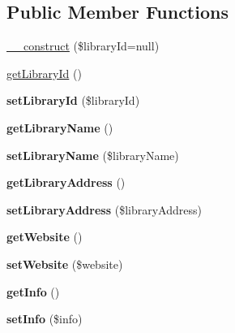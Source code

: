 \subsection*{Public Member Functions}
\begin{DoxyCompactItemize}
\item 
\hyperlink{classLibrary_a448367379e1917a080692b9f7d09b2af}{\_\-\_\-construct} (\$libraryId=null)
\item 
\hyperlink{classLibrary_a34d5adadf5e40827701eb60578f7a0f3}{getLibraryId} ()
\item 
\hypertarget{classLibrary_a3c6fc6ea2264853d5b429b8efccc28f3}{
{\bfseries setLibraryId} (\$libraryId)}
\label{classLibrary_a3c6fc6ea2264853d5b429b8efccc28f3}

\item 
\hypertarget{classLibrary_a659f8b8b2794c0dc94433d5031537cd7}{
{\bfseries getLibraryName} ()}
\label{classLibrary_a659f8b8b2794c0dc94433d5031537cd7}

\item 
\hypertarget{classLibrary_aaa6854a276ca6f3205f9f50765e58b3e}{
{\bfseries setLibraryName} (\$libraryName)}
\label{classLibrary_aaa6854a276ca6f3205f9f50765e58b3e}

\item 
\hypertarget{classLibrary_ad1cb79a230bdc75537af95c9dd2e8e68}{
{\bfseries getLibraryAddress} ()}
\label{classLibrary_ad1cb79a230bdc75537af95c9dd2e8e68}

\item 
\hypertarget{classLibrary_a55af3acbe5cc36d495ef5eae6709e73a}{
{\bfseries setLibraryAddress} (\$libraryAddress)}
\label{classLibrary_a55af3acbe5cc36d495ef5eae6709e73a}

\item 
\hypertarget{classLibrary_a14e025adb3ccebbbde3392a1b238c352}{
{\bfseries getWebsite} ()}
\label{classLibrary_a14e025adb3ccebbbde3392a1b238c352}

\item 
\hypertarget{classLibrary_a1111c98cd08c2aca57e9d312aa4c7005}{
{\bfseries setWebsite} (\$website)}
\label{classLibrary_a1111c98cd08c2aca57e9d312aa4c7005}

\item 
\hypertarget{classLibrary_a48bb994e851407e81e703e78a4f97b16}{
{\bfseries getInfo} ()}
\label{classLibrary_a48bb994e851407e81e703e78a4f97b16}

\item 
\hypertarget{classLibrary_ae9a047ee6e26b0eda6df0659400f8f5f}{
{\bfseries setInfo} (\$info)}
\label{classLibrary_ae9a047ee6e26b0eda6df0659400f8f5f}

\end{DoxyCompactItemize}

